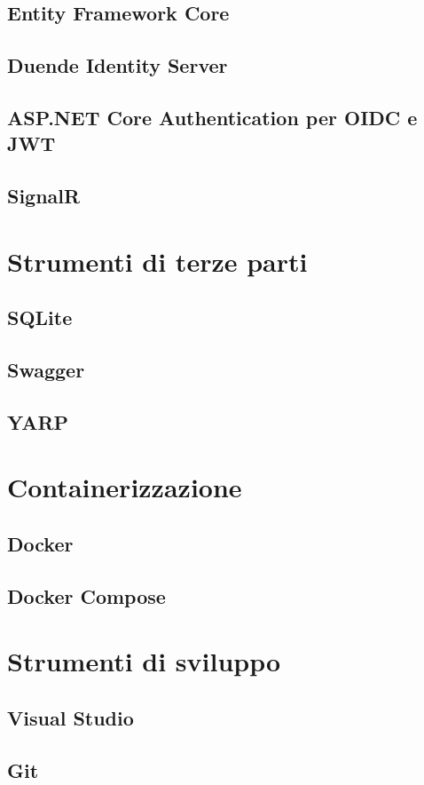 \subsection{Entity Framework Core}
\subsection{Duende Identity Server}
\subsection{ASP.NET Core Authentication per OIDC e JWT}
\subsection{SignalR}
\section{Strumenti di terze parti}
\subsection{SQLite}
\subsection{Swagger}
\subsection{YARP}
\section{Containerizzazione}
\subsection{Docker}
\subsection{Docker Compose}
\section{Strumenti di sviluppo}
\subsection{Visual Studio}
\subsection{Git}
